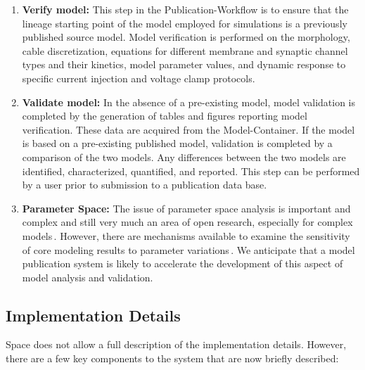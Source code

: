 \documentclass[12pt]{article}
\begin{document}
\begin{enumerate}
   \item  {\bf Verify model:} This step in the Publication-Workflow is to ensure that the lineage starting point of the model employed for simulations is a previously published source model. Model verification is performed on the morphology, cable discretization, equations for different membrane and synaptic channel types and their kinetics, model parameter values, and dynamic response to specific current injection and voltage clamp protocols.
   \item  {\bf  Validate model:} In the absence of a pre-existing model, model validation is completed by the generation of tables and figures reporting model verification. These data are acquired from the Model-Container. If the model is based on a pre-existing published model, validation is completed by a comparison of the two models. Any differences between the two models are identified, characterized, quantified, and reported. This step can be performed by a user prior to submission to a publication data base.
   \item  {\bf Parameter Space:} The issue of parameter space analysis is important and complex and still very much an area of open research, especially for complex models\,\cite{Baldi:1998qa, vanier99:_compar_survey_autom_param_searc}. However, there are mechanisms available to examine the sensitivity of core modeling results to parameter variations\,\cite{Achard:2006mb}.  We anticipate that a model publication system is likely to accelerate the development of this aspect of model analysis and validation.
\end{enumerate}

\subsection*{Implementation Details}

Space does not allow a full description of the implementation details.  However, there are a few key components to the system that are now briefly described:
\end{document}
